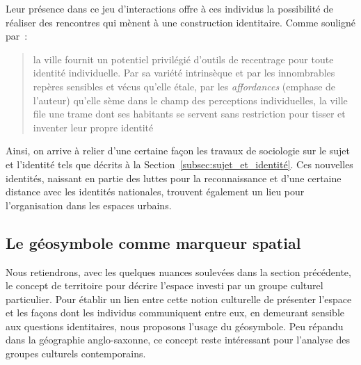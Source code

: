 Leur présence dans ce jeu d'interactions offre à ces individus la possibilité de réaliser des rencontres qui mènent à une construction identitaire. 
Comme souligné par~\citeauthor{DiMeo2007}: \blockquote[{\cite[81]{DiMeo2007}}][.]{\textelp{} la ville fournit un potentiel privilégié d’outils de recentrage pour toute identité individuelle. Par sa variété intrinsèque et par les innombrables repères sensibles et vécus qu’elle étale, par les \emph{affordances} (emphase de l'auteur) qu’elle sème dans le champ des perceptions individuelles, la ville file une trame dont ses habitants se servent sans restriction pour tisser et inventer leur propre identité}.

Ainsi, on arrive à relier d'une certaine façon les travaux de sociologie sur le sujet et l'identité tels que décrits à la Section~\ref{subsec:sujet_et_identité}. 
Ces nouvelles identités, naissant en partie des luttes pour la reconnaissance et d'une certaine distance avec les identités nationales, trouvent également un lieu pour l'organisation dans les espaces urbains.





\subsection{Le géosymbole comme marqueur spatial}
\label{sec:le_symbole_comme_marqueur_spatial} Nous retiendrons, avec les quelques nuances soulevées dans la section précédente, le concept de territoire pour décrire l'espace investi par un groupe culturel particulier. 
Pour établir un lien entre cette notion culturelle de présenter l'espace et les façons dont les individus communiquent entre eux, en demeurant sensible aux questions identitaires, nous proposons l'usage du géosymbole. 
Peu répandu dans la géographie anglo-saxonne, ce concept reste intéressant pour l'analyse des groupes culturels contemporains.

